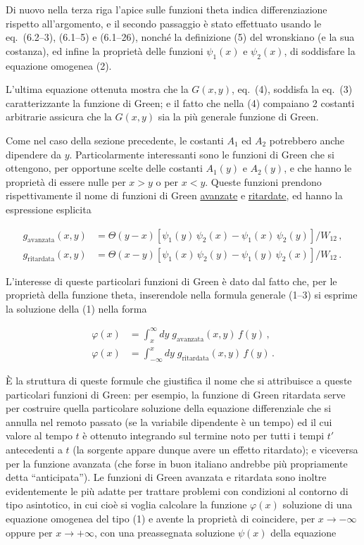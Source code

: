 \documentclass[11pt, a4paper]{book}
\numberwithin{equation}{section}
\begin{document}
Di nuovo nella terza riga l'apice sulle funzioni theta indica differenziazione rispetto all'argomento, e il secondo passaggio è stato effettuato usando le eq.\ (6.2--3), (6.1--5) e (6.1--26), nonché la definizione (5) del wronskiano (e la sua costanza), ed infine la proprietà delle funzioni $\psi_1(x)$ e $\psi_2(x)$, di soddisfare la equazione omogenea (2).

L'ultima equazione ottenuta mostra che la $G(x,y)$, eq.\ (4), soddisfa la eq.\ (3) caratterizzante la funzione di Green; e il fatto che nella (4) compaiano 2 costanti arbitrarie assicura che la $G(x,y)$ sia la più generale funzione di Green.


Come nel caso della sezione precedente, le costanti $A_1$ ed $A_2$ potrebbero anche dipendere da $y$. Particolarmente interessanti sono le funzioni di Green che si ottengono, per opportune scelte delle costanti $A_1(y)$ e $A_2(y)$, e che hanno le proprietà di essere nulle per $x > y$ o per $x < y$. Queste funzioni prendono rispettivamente il nome di funzioni di Green \uline{avanzate} e \uline{ritardate}, ed hanno la espressione esplicita

\begin{align}
\tag{6a} g_{\text{avanzata}}(x,y) &= \Theta(y-x)\left[\psi_1(y)\,\psi_2(x) - \psi_1(x)\,\psi_2(y)\right]/W_{12}\,, \\
\tag{6b} g_{\text{ritardata}}(x,y) &= \Theta(x-y)\left[\psi_1(x)\,\psi_2(y) - \psi_1(y)\,\psi_2(x)\right]/W_{12}\,.
\end{align}

L'interesse di queste particolari funzioni di Green è dato dal fatto che, per le proprietà della funzione theta, inserendole nella formula generale (1--3) si esprime la soluzione della (1) nella forma

\begin{align}
\tag{7a} \varphi(x) &= \int_x^{\infty} dy\; g_{\text{avanzata}}(x,y)\,f(y)\,, \\
\tag{7b} \varphi(x) &= \int_{-\infty}^{x} dy\; g_{\text{ritardata}}(x,y)\,f(y)\,.
\end{align}

È la struttura di queste formule che giustifica il nome che si attribuisce a queste particolari funzioni di Green: per esempio, la funzione di Green ritardata serve per costruire quella particolare soluzione della equazione differenziale che si annulla nel remoto passato (se la variabile dipendente è un tempo) ed il cui valore al tempo $t$ è ottenuto integrando sul termine noto per tutti i tempi $t'$ antecedenti a $t$ (la sorgente appare dunque avere un effetto ritardato); e viceversa per la funzione avanzata (che forse in buon italiano andrebbe più propriamente detta ``anticipata''). Le funzioni di Green avanzata e ritardata sono inoltre evidentemente le più adatte per trattare problemi con condizioni al contorno di tipo asintotico, in cui cioè si voglia calcolare la funzione $\varphi(x)$ soluzione di una equazione omogenea del tipo (1) e avente la proprietà di coincidere, per $x \to -\infty$ oppure per $x \to +\infty$, con una preassegnata soluzione $\psi(x)$ della equazione
\end{document}
